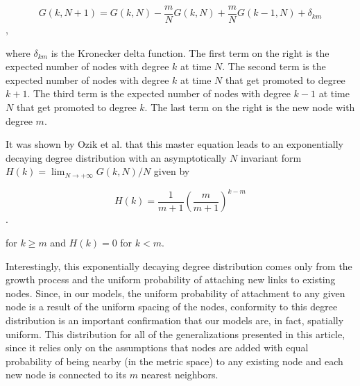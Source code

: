 \documentclass[aps,pre,reprint,superscriptaddress,amsmath,amssymb]{revtex4-1}
\begin{document}
\[G(k,N+1) = G(k,N) - \frac{m}{N}G(k,N) + \frac{m}{N}G(k-1,N) + \delta_{km}\],

\noindent where $\delta_{km}$ is the Kronecker delta function.
The first term on the right is the expected number of nodes with degree $k$ at time $N$.
The second term is the expected number of nodes with degree $k$ at time $N$ that get promoted to degree $k+1$.
The third term is the expected number of nodes with degree $k-1$ at time $N$ that get promoted to degree $k$.
The last term on the right is the new node with degree $m$.

It was shown by Ozik et al. \cite{ozik2004} that this master equation leads to an exponentially decaying degree distribution with an asymptotically $N$ invariant form $H(k) = \lim_{N \to +\infty} G(k,N)/N$ given by

\[H(k) = \frac{1}{m+1}\left(\frac{m}{m+1}\right)^{k-m}\].

\noindent for $k \geq m$ and $H(k) = 0$ for $k < m$.

Interestingly, this exponentially decaying degree distribution comes only from the growth process and the uniform probability of attaching new links to existing nodes.  
Since, in our models, the uniform probability of attachment to any given node is a result of the uniform spacing of the nodes, conformity to this degree distribution is an important confirmation that our models are, in fact, spatially uniform.
This distribution for all of the generalizations presented in this article, since it relies only on the assumptions that nodes are added with equal probability of being nearby (in the metric space) to any existing node and each new node is connected to its $m$ nearest neighbors.

\end{document}
